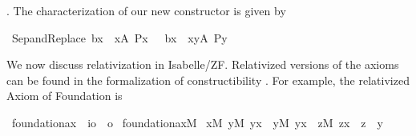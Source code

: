 . The
characterization of our new constructor is given by
\begin{isabelle}
\isamarkupfalse%
\ Sep{\isacharunderscore}and{\isacharunderscore}Replace{\isacharcolon}\ {\isachardoublequoteopen}{\isacharbraceleft}b{\isacharparenleft}x{\isacharparenright}\ {\isachardot}{\isachardot}\ x{\isasymin}A{\isacharcomma}\ P{\isacharparenleft}x{\isacharparenright}\ {\isacharbraceright}\ {\isacharequal}\ {\isacharbraceleft}b{\isacharparenleft}x{\isacharparenright}\ {\isachardot}\ x{\isasymin}{\isacharbraceleft}y{\isasymin}A{\isachardot}\ P{\isacharparenleft}y{\isacharparenright}{\isacharbraceright}{\isacharbraceright}{\isachardoublequoteclose}
\end{isabelle}


We now discuss relativization in Isabelle/ZF. Relativized versions of the
 axioms can be found in the formalization of constructibility \cite{paulson_2003}. For
 example, the relativized Axiom of Foundation is
\begin{isabelle}
\isamarkupfalse%
\ foundation{\isacharunderscore}ax\ {\isacharcolon}{\isacharcolon}\ {\isachardoublequoteopen}{\isacharparenleft}i{\isacharequal}{\isachargreater}o{\isacharparenright}\ {\isacharequal}{\isachargreater}\ o{\isachardoublequoteclose}\ \isanewline
 {\isachardoublequoteopen}foundation{\isacharunderscore}ax{\isacharparenleft}M{\isacharparenright}\ {\isacharequal}{\isacharequal}\isanewline
  {\isasymforall}x{\isacharbrackleft}M{\isacharbrackright}{\isachardot}\ {\isacharparenleft}{\isasymexists}y{\isacharbrackleft}M{\isacharbrackright}{\isachardot}\ y{\isasymin}x{\isacharparenright}\ {\isasymlongrightarrow}\ {\isacharparenleft}{\isasymexists}y{\isacharbrackleft}M{\isacharbrackright}{\isachardot}\ y{\isasymin}x\ {\isacharampersand}\ {\isachartilde}{\isacharparenleft}{\isasymexists}z{\isacharbrackleft}M{\isacharbrackright}{\isachardot}\ z{\isasymin}x\ {\isacharampersand}\ z\ {\isasymin}\ y{\isacharparenright}{\isacharparenright}{\isachardoublequoteclose}
\end{isabelle}

